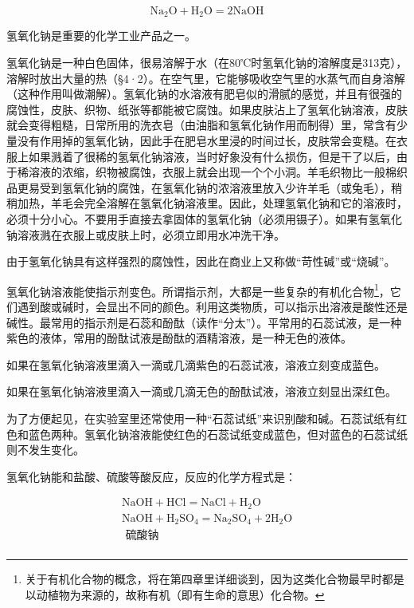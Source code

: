 \[
\mathrm{Na}_{2} \mathrm{O} + \mathrm{H}_{2} \mathrm{O} = 2 \mathrm{NaOH}
\]

氢氧化钠是重要的化学工业产品之一。

氢氧化钠是一种白色固体，很易溶解于水（在80℃时氢氧化钠的溶解度是313克），溶解时放出大量的热（§4·2）。在空气里，它能够吸收空气里的水蒸气而自身溶解（这种作用叫做潮解）。氢氧化钠的水溶液有肥皂似的滑腻的感觉，并且有很强的腐蚀性，皮肤、织物、纸张等都能被它腐蚀。如果皮肤沾上了氢氧化钠溶液，皮肤就会变得粗糙，日常所用的洗衣皂（由油脂和氢氧化钠作用而制得）里，常含有少量没有作用掉的氢氧化钠，因此手在肥皂水里浸的时间过长，皮肤常会变糙。在衣服上如果溅着了很稀的氢氧化钠溶液，当时好象没有什么损伤，但是干了以后，由于稀溶液的浓缩，织物被腐蚀，衣服上就会出现一个个小洞。羊毛织物比一般棉织品更易受到氢氧化钠的腐蚀，在氢氧化钠的浓溶液里放入少许羊毛（或兔毛），稍稍加热，羊毛会完全溶解在氢氧化钠溶液里。因此，处理氢氧化钠和它的溶液时，必须十分小心。不要用手直接去拿固体的氢氧化钠（必须用镊子）。如果有氢氧化钠溶液溅在衣服上或皮肤上时，必须立即用水冲洗干净。

由于氢氧化钠具有这样强烈的腐蚀性，因此在商业上又称做``苛性碱''或``烧碱''。

氢氧化钠溶液能使指示剂变色。所谓指示剂，大都是一些复杂的有机化合物\footnote{关于有机化合物的概念，将在第四章里详细谈到，因为这类化合物最早时都是以动植物为来源的，故称有机（即有生命的意思）化合物。}，它们遇到酸或碱时，会显出不同的颜色。利用这类物质，可以指示出溶液是酸性还是碱性。最常用的指示剂是石蕊和酚酞（读作``分太''）。平常用的石蕊试液，是一种紫色的液体，常用的酚酞试液是酚酞的酒精溶液，是一种无色的液体。

如果在氢氧化钠溶液里滴入一滴或几滴紫色的石蕊试液，溶液立刻变成蓝色。

如果在氢氧化钠溶液里滴入一滴或几滴无色的酚酞试液，溶液立刻显出深红色。

为了方便起见，在实验室里还常使用一种``石蕊试纸''来识别酸和碱。石蕊试纸有红色和蓝色两种。氢氧化钠溶液能使红色的石蕊试纸变成蓝色，但对蓝色的石蕊试纸则不发生变化。

氢氧化钠能和盐酸、硫酸等酸反应，反应的化学方程式是：

\[
\begin{array}{l} \mathrm{NaOH} + \mathrm{HCl} = \mathrm{NaCl} + \mathrm{H}_{2} \mathrm{O} \\ \mathrm{NaOH} + \mathrm{H}_{2} \mathrm{SO}_{4} = \mathrm{Na}_{2} \mathrm{SO}_{4} + 2 \mathrm{H}_{2} \mathrm{O} \\ \text{ 硫酸钠 } \\ \end{array}
\]

